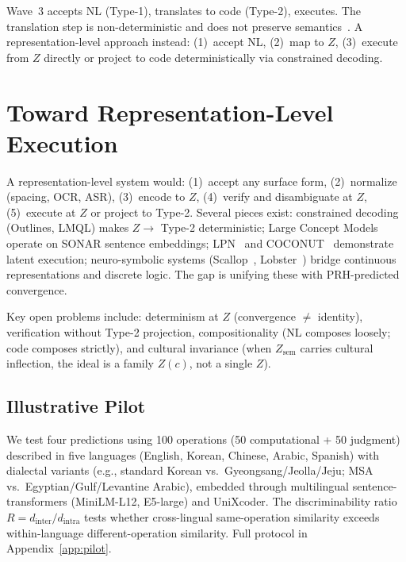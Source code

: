 \documentclass{article}
\theoremstyle{definition}
\newcommand{\Zsem}{Z_{\text{sem}}}
\begin{document}
Wave~3 accepts NL (Type-1), translates to code (Type-2), executes. The translation step is non-deterministic and does not preserve semantics~\citep{cheung2025translation}. A representation-level approach instead: (1)~accept NL, (2)~map to $Z$, (3)~execute from $Z$ directly or project to code deterministically via constrained decoding.


\section{Toward Representation-Level Execution}\label{sec:toward}

A representation-level system would: (1)~accept any surface form, (2)~normalize (spacing, OCR, ASR), (3)~encode to $Z$, (4)~verify and disambiguate at $Z$, (5)~execute at $Z$ or project to Type-2. Several pieces exist: constrained decoding (Outlines, LMQL) makes $Z \to$ Type-2 deterministic; Large Concept Models~\citep{meta2024lcm} operate on SONAR sentence embeddings; LPN~\citep{macfarlane2025lpn} and COCONUT~\citep{hao2024coconut} demonstrate latent execution; neuro-symbolic systems (Scallop~\citep{li2023scallop}, Lobster~\citep{huang2026lobster}) bridge continuous representations and discrete logic. The gap is unifying these with PRH-predicted convergence.

Key open problems include: determinism at $Z$ (convergence $\neq$ identity), verification without Type-2 projection, compositionality (NL composes loosely; code composes strictly), and cultural invariance (when $\Zsem$ carries cultural inflection, the ideal is a family $Z(c)$, not a single $Z$).

\subsection{Illustrative Pilot}\label{sec:pilot}

We test four predictions using 100 operations (50 computational + 50 judgment) described in five languages (English, Korean, Chinese, Arabic, Spanish) with dialectal variants (e.g., standard Korean vs.\ Gyeongsang/Jeolla/Jeju; MSA vs.\ Egyptian/Gulf/Levantine Arabic), embedded through multilingual sentence-transformers (MiniLM-L12, E5-large) and UniXcoder. The discriminability ratio $R = d_{\text{inter}}/d_{\text{intra}}$ tests whether cross-lingual same-operation similarity exceeds within-language different-operation similarity. Full protocol in Appendix~\ref{app:pilot}.
\end{document}
